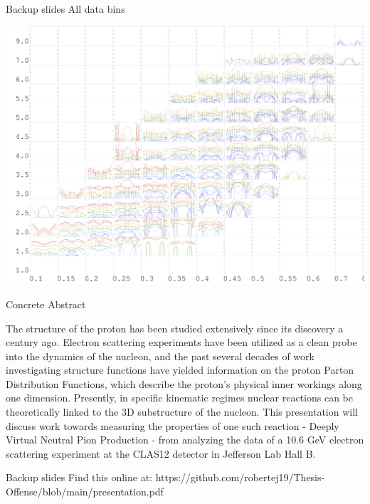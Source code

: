 \documentclass[aspectratio=169]{beamer}
\newcommand*{\myfont}{\fontfamily{lmtt}\selectfont}
\begin{document}
%    







\begin{frame}{Backup slides}
\centering
All data bins

    \includegraphics[scale=0.172832]{Introduction/alldatapoints.png}
\end{frame}



\begin{frame}{Concrete Abstract}

The structure of the proton has been studied extensively since its discovery a century ago.  Electron scattering experiments have been utilized as a clean probe into the dynamics of the nucleon, and the past several decades of work investigating structure functions have yielded information on the proton Parton Distribution Functions, which describe the proton's physical inner workings along one dimension. Presently, in specific kinematic regimes nuclear reactions can be theoretically linked to the 3D substructure of the nucleon. This presentation will discuss work towards measuring the properties of one such reaction - Deeply Virtual Neutral Pion Production - from analyzing the data of a 10.6 GeV electron scattering experiment at the CLAS12 detector in Jefferson Lab Hall B. 

\end{frame}


\begin{frame}{Backup slides}
\centering
    Find this online at: https://github.com/robertej19/Thesis-Offense/blob/main/presentation.pdf
\end{frame}
\end{document}
